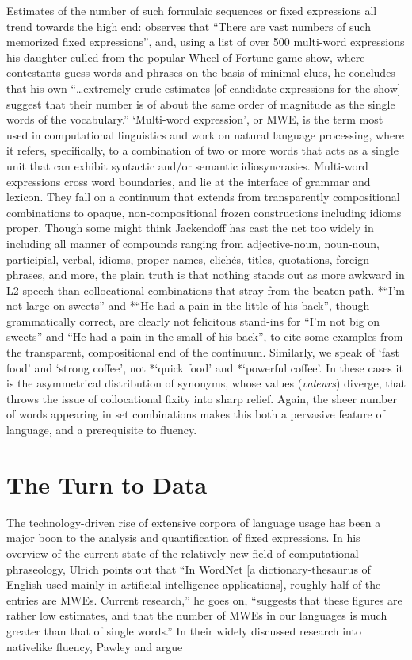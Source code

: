 \documentclass[output=paper]{langsci/langscibook}
\begin{document}
Estimates of the number of such formulaic sequences or fixed expressions all trend towards the high end: \citet[156]{jackendoff_architecture_1997} observes that “There are vast numbers of such memorized fixed expressions”, and, using a list of over 500 multi-word expressions his daughter culled from the popular Wheel of Fortune game show, where contestants guess words and phrases on the basis of minimal clues, he concludes that his own “…extremely crude estimates [of candidate expressions for the show] suggest that their number is of about the same order of magnitude as the single words of the vocabulary.” ‘Multi-word expression’, or MWE, is the term most used in computational linguistics and work on natural language processing, where it refers, specifically, to a combination of two or more words that acts as a single unit that can exhibit syntactic and/or semantic idiosyncrasies. Multi-word expressions cross word boundaries, and lie at the interface of grammar and lexicon. They fall on a continuum that extends from transparently compositional combinations to opaque, non-compositional frozen constructions including idioms proper. Though some might think Jackendoff has cast the net too widely in including all manner of compounds ranging from adjective-noun, noun-noun, participial, verbal, idioms, proper names, clichés, titles, quotations, foreign phrases, and more, the plain truth is that nothing stands out as more awkward in L2 speech than collocational combinations that stray from the beaten path. *“I’m not large on sweets” and *“He had a pain in the little of his back”, though grammatically correct, are clearly not felicitous stand-ins for “I’m not big on sweets” and “He had a pain in the small of his back”, to cite some examples from the transparent, compositional end of the continuum. Similarly, we speak of ‘fast food’ and ‘strong coffee’, not *‘quick food’ and *‘powerful coffee’. In these cases it is the asymmetrical distribution of synonyms, whose values (\textit{valeurs}) diverge, that throws the issue of collocational fixity into sharp relief. Again, the sheer number of words appearing in set combinations makes this both a pervasive feature of language, and a prerequisite to fluency. 

\section{The Turn to Data}

The technology-driven rise of extensive corpora of language usage has been a major boon to the analysis and quantification of fixed expressions. In his overview of the current state of the relatively new field of computational phraseology, Ulrich \citet[348]{granger_computational_2008} points out that “In WordNet [a dictionary-thesaurus of English used mainly in artificial intelligence applications], roughly half of the entries are MWEs. Current research,” he goes on, “suggests that these figures are rather low estimates, and that the number of MWEs in our languages is much greater than that of single words.” In their widely discussed research into nativelike fluency, Pawley and \citet[191-192]{richards_two_1983} argue 
\end{document}
